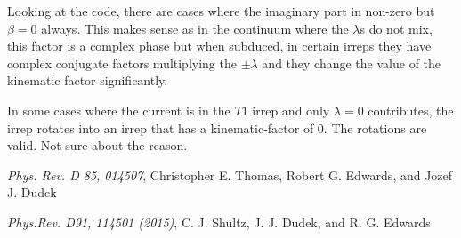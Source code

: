 \documentclass[10pt]{article}
\begin{document}
{\begin{enumerate}
Looking at the code, there are cases where the imaginary part in non-zero but $\beta = 0$ always. This makes sense as in the continuum where the $\lambda$s do not mix, this factor is a complex phase but when subduced, in certain irreps they have complex conjugate factors multiplying the $\pm \lambda$ and they change the value of the kinematic factor significantly. \par
In some cases where the current is in the $T1$ irrep and only $\lambda = 0$ contributes, the irrep rotates into an irrep that has a kinematic-factor of 0. The rotations are valid. Not sure about the reason.
\end{enumerate}}\fi


\newpage
\begin{thebibliography}{9}

     \textit{Phys. Rev. D 85, 014507},         
       Christopher E. Thomas, Robert G. Edwards, and Jozef J. Dudek    

     \textit{Phys.Rev. D91, 114501 (2015)},         
       C. J. Shultz, J. J. Dudek, and R. G. Edwards       


\end{thebibliography}
\end{document}
